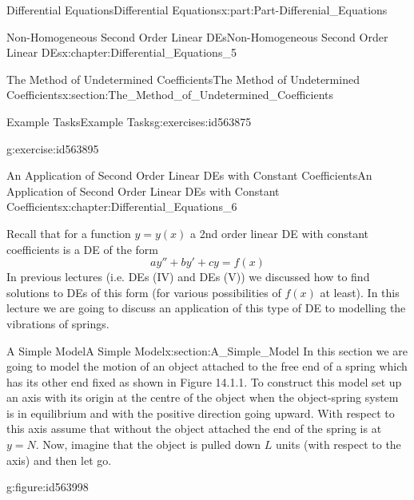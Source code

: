 \documentclass[oneside,10pt,]{book}
\numberwithin{equation}{section}
\begin{document}
\begin{partptx}{Differential Equations}{}{Differential Equations}{}{}{x:part:Part-Differenial_Equations}
\begin{chapterptx}{Non-Homogeneous Second Order Linear DEs}{}{Non-Homogeneous Second Order Linear DEs}{}{}{x:chapter:Differential_Equations_5}
\begin{sectionptx}{The Method of Undetermined Coefficients}{}{The Method of Undetermined Coefficients}{}{}{x:section:The_Method_of_Undetermined_Coefficients}
\begin{exercises-subsection-numberless}{Example Tasks}{}{Example Tasks}{}{}{g:exercises:id563875}
\begin{divisionexercise}{4}{}{}{g:exercise:id563895}
%
\end{divisionexercise}%
\end{exercises-subsection-numberless}
\end{sectionptx}
\end{chapterptx}
%
\typeout{************************************************}
\typeout{************************************************}
%
\begin{chapterptx}{An Application of Second Order Linear DEs with Constant Coefficients}{}{An Application of Second Order Linear DEs with Constant Coefficients}{}{}{x:chapter:Differential_Equations_6}
\begin{introduction}{}%
Recall that for a function \(y=y(x)\) a 2nd order linear DE with constant coefficients is a DE of the form%
\begin{equation*}
ay''+by'+cy=f(x)
\end{equation*}
In previous lectures (i.e. DEs (IV) and DEs (V)) we discussed how to find solutions to DEs of this form (for various possibilities of \(f(x)\) at least). In this lecture we are going to discuss an application of this type of DE to modelling the vibrations of springs.%
\end{introduction}%
%
%
\typeout{************************************************}
\typeout{************************************************}
%
\begin{sectionptx}{A Simple Model}{}{A Simple Model}{}{}{x:section:A_Simple_Model}
In this section we are going to model the motion of an object attached to the free end of a spring which has its other end fixed as shown in Figure 14.1.1. To construct this model set up an axis with its origin at the centre of the object when the object-spring system is in equilibrium and with the positive direction going upward. With respect to this axis assume that without the object attached the end of the spring is at \(y=N\). Now, imagine that the object is pulled down \(L\) units (with respect to the axis) and then let go. \begin{figureptx}{}{g:figure:id563998}{}%
\begin{image}{0.125}{0.75}{0.125}%

\end{image}
\end{figureptx}
\end{sectionptx}
\end{chapterptx}
\end{partptx}
\end{document}
